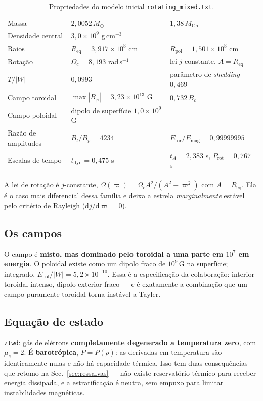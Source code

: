 \documentclass[11pt,a4paper]{article}
\newcommand{\Msun}{M_\odot}
\newcommand{\Req}{R_{\mathrm{eq}}}
\newcommand{\Rpol}{R_{\mathrm{pol}}}
\newcommand{\Btor}{B_\varphi}
\newcommand{\Etor}{E_{\mathrm{tor}}}
\newcommand{\Epol}{E_{\mathrm{pol}}}
\begin{document}
\begin{table}[h]
\centering
\small
\begin{tabular}{lll}
\toprule
Massa & $2{,}0052\,\Msun$ & $1{,}38\,M_{\mathrm{Ch}}$ \\
Densidade central & $3{,}0\times10^{9}$ g\,cm$^{-3}$ & \\
Raios & $\Req = 3{,}917\times10^8$ cm & $\Rpol = 1{,}501\times10^8$ cm \\
Rotação & $\Omega_c = 8{,}193$ rad\,s$^{-1}$ & lei $j$-constante, $A = \Req$ \\
$T/|W|$ & $0{,}0993$ & parâmetro de \emph{shedding} $0{,}469$ \\
Campo toroidal & $\max|\Btor| = 3{,}23\times10^{13}$ G & $0{,}732\,B_c$ \\
Campo poloidal & dipolo de superfície $1{,}0\times10^{9}$ G & \\
Razão de amplitudes & $B_t/B_p = 4234$ & $\Etor/E_{\mathrm{mag}} = 0{,}99999995$ \\
Escalas de tempo & $t_{\mathrm{dyn}} = 0{,}475$ s & $t_A = 2{,}383$ s, $P_{\mathrm{rot}} = 0{,}767$ s \\
\bottomrule
\end{tabular}
\caption{Propriedades do modelo inicial \texttt{rotating\_mixed.txt}.}
\end{table}

A lei de rotação é $j$-constante, $\Omega(\varpi) = \Omega_c A^2/(A^2+\varpi^2)$
com $A = \Req$. Ela é o caso mais diferencial dessa família e deixa a estrela
\emph{marginalmente} estável pelo critério de Rayleigh ($\mathrm{d}j/\mathrm{d}\varpi = 0$).

\subsection{Os campos}

O campo é \textbf{misto, mas dominado pelo toroidal a uma parte em $10^7$ em
energia}. O poloidal existe como um dipolo fraco de $10^9$\,G na superfície;
integrado, $\Epol/|W| = 5{,}2\times10^{-10}$. Essa é a especificação da
colaboração: interior toroidal intenso, dipolo exterior fraco --- e é exatamente
a combinação que um campo puramente toroidal torna instável a Tayler.

\subsection{Equação de estado}

\texttt{ztwd}: gás de elétrons \textbf{completamente degenerado a temperatura
zero}, com $\mu_e = 2$. É \textbf{barotrópica}, $P = P(\rho)$: as derivadas em
temperatura são identicamente nulas e não há capacidade térmica. Isso tem duas
consequências que retomo na Sec.~\ref{sec:ressalvas} --- não existe reservatório
térmico para receber energia dissipada, e a estratificação é neutra, sem empuxo
para limitar instabilidades magnéticas.
\end{document}
